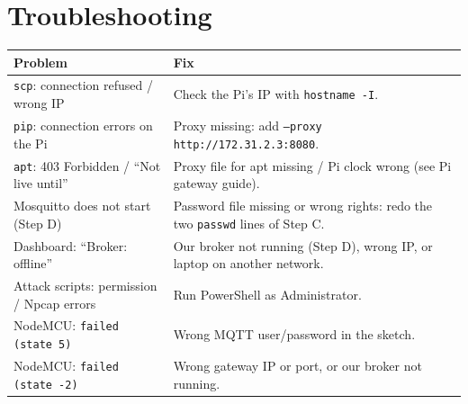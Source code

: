 \documentclass[11pt]{article}
\begin{document}
\section{Troubleshooting}
\begin{longtable}{@{}>{\raggedright}p{5.6cm} >{\raggedright\arraybackslash}p{10.2cm}@{}}
\toprule
\textbf{Problem} & \textbf{Fix} \\
\midrule
\endhead
\texttt{scp}: connection refused / wrong IP & Check the Pi's IP with \texttt{hostname -I}. \\
\texttt{pip}: connection errors on the Pi & Proxy missing: add \texttt{--proxy http://172.31.2.3:8080}. \\
\texttt{apt}: 403 Forbidden / ``Not live until'' & Proxy file for apt missing / Pi clock wrong (see Pi gateway guide). \\
Mosquitto does not start (Step D) & Password file missing or wrong rights: redo the two \texttt{passwd} lines of Step C. \\
Dashboard: ``Broker: offline'' & Our broker not running (Step D), wrong IP, or laptop on another network. \\
Attack scripts: permission / Npcap errors & Run PowerShell as Administrator. \\
NodeMCU: \texttt{failed (state 5)} & Wrong MQTT user/password in the sketch. \\
NodeMCU: \texttt{failed (state -2)} & Wrong gateway IP or port, or our broker not running. \\
\bottomrule
\end{longtable}
\end{document}

